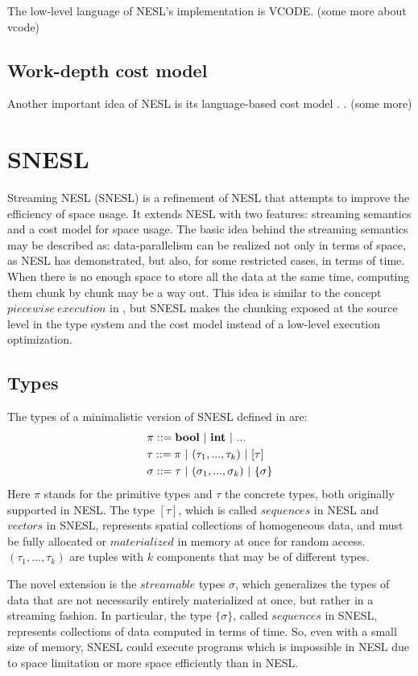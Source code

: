 The low-level language of NESL's implementation is VCODE. 
(some more about vcode)

\subsection{Work-depth cost model}
Another important idea of NESL is its language-based cost model \cite{blel96cost}.  \cite{prins93}. 
(some more)

\section{SNESL}
Streaming NESL (SNESL) \cite{Fphd} is a refinement of NESL
that attempts to improve the efficiency of space usage. 
It extends NESL with two features: streaming semantics and a cost model for space usage. 
The basic idea behind the streaming semantics may be described as:
data-parallelism can be realized not only in terms of space, as NESL has demonstrated, but also, for some restricted cases, in terms of time. 
When there is no enough space to store all the data at the same time, computing them chunk by chunk may be a way out.
This idea is similar to the concept $piecewise \ execution$ in \cite{palm95}, but SNESL makes the chunking exposed at the source level in the type system and the cost model instead of a low-level execution optimization.

\subsection{Types}

The types of a minimalistic version of SNESL defined in \cite{Fphd} are:
\begin{align*} 
& \pi ::= \bool \ | \ \int \ | \ ...  \\
& \tau ::= \pi \ | \ (\tau_1,...,\tau_k) \ | \ [\tau]  \\
& \sigma ::= \tau \ | \ (\sigma_1,...,\sigma_k) \ | \ \tseq{\sigma}  
\end{align*}
Here $\pi$ stands for the primitive types and $\tau$ the concrete types, both originally supported in NESL.
The type $[\tau]$, which is called $sequences$ in NESL and $vectors$ in SNESL, represents spatial collections of homogeneous data, and must be
fully allocated or $materialized$ in memory at once for random access.  
$(\tau_1,...,\tau_k)$ are tuples with $k$ components that may be of different types.

The novel extension is the $streamable$ types $\sigma$, which generalizes the types of data that are not necessarily entirely materialized at once, but rather in a streaming fashion. 
In particular, the type $\{\sigma\}$, called $sequences$ in SNESL, represents collections of data computed in terms of time.
So, even with a small size of memory, SNESL could execute programs which is impossible in NESL due to space limitation or more space efficiently than in NESL. 

